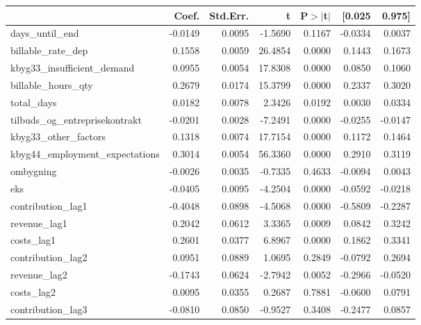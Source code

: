 \begin{table}
\begin{center}
\begin{tabular}{lrrrrrr}
\hline
                                   &   Coef. & Std.Err. &       t & P$> |$t$|$ &  [0.025 &  0.975]  \\
\hline
days\_until\_end                   & -0.0149 &   0.0095 & -1.5690 &      0.1167 & -0.0334 &  0.0037  \\
billable\_rate\_dep                &  0.1558 &   0.0059 & 26.4854 &      0.0000 &  0.1443 &  0.1673  \\
kbyg33\_insufficient\_demand       &  0.0955 &   0.0054 & 17.8308 &      0.0000 &  0.0850 &  0.1060  \\
billable\_hours\_qty               &  0.2679 &   0.0174 & 15.3799 &      0.0000 &  0.2337 &  0.3020  \\
total\_days                        &  0.0182 &   0.0078 &  2.3426 &      0.0192 &  0.0030 &  0.0334  \\
tilbuds\_og\_entreprisekontrakt    & -0.0201 &   0.0028 & -7.2491 &      0.0000 & -0.0255 & -0.0147  \\
kbyg33\_other\_factors             &  0.1318 &   0.0074 & 17.7154 &      0.0000 &  0.1172 &  0.1464  \\
kbyg44\_employment\_expectations   &  0.3014 &   0.0054 & 56.3360 &      0.0000 &  0.2910 &  0.3119  \\
ombygning                          & -0.0026 &   0.0035 & -0.7335 &      0.4633 & -0.0094 &  0.0043  \\
eks                                & -0.0405 &   0.0095 & -4.2504 &      0.0000 & -0.0592 & -0.0218  \\
contribution\_lag1                 & -0.4048 &   0.0898 & -4.5068 &      0.0000 & -0.5809 & -0.2287  \\
revenue\_lag1                      &  0.2042 &   0.0612 &  3.3365 &      0.0009 &  0.0842 &  0.3242  \\
costs\_lag1                        &  0.2601 &   0.0377 &  6.8967 &      0.0000 &  0.1862 &  0.3341  \\
contribution\_lag2                 &  0.0951 &   0.0889 &  1.0695 &      0.2849 & -0.0792 &  0.2694  \\
revenue\_lag2                      & -0.1743 &   0.0624 & -2.7942 &      0.0052 & -0.2966 & -0.0520  \\
costs\_lag2                        &  0.0095 &   0.0355 &  0.2687 &      0.7881 & -0.0600 &  0.0791  \\
contribution\_lag3                 & -0.0810 &   0.0850 & -0.9527 &      0.3408 & -0.2477 &  0.0857  \\

\end{tabular}
\end{center}
\end{table}
